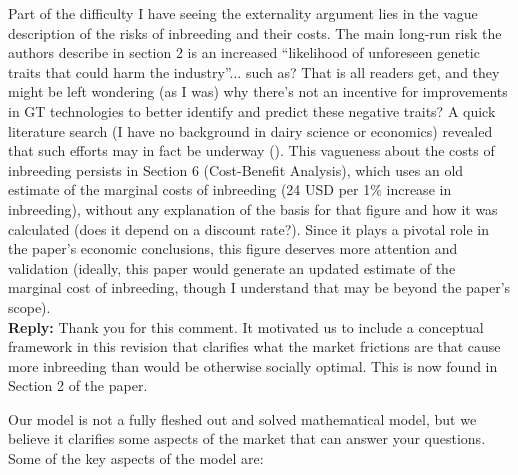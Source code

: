\documentclass[12pt,letterpaper]{article}
\begin{document}
{Part of the difficulty I have seeing the externality argument lies in the vague
description of the risks of inbreeding and their costs. The main long-run risk the
authors describe in section 2 is an increased ``likelihood of unforeseen genetic traits that could harm the industry''... such as? That is all readers get, and they might be left wondering (as I was) why there’s not an incentive for improvements in GT technologies to better identify and predict these negative traits? A quick literature search (I have no background in dairy science or economics) revealed that such efforts may in fact be underway (\cite{Howard2017}). This vagueness about the costs of inbreeding persists in Section 6 (Cost-Benefit Analysis), which uses an old estimate of the marginal costs of inbreeding (24 USD per 1\% increase in inbreeding), without any explanation of the basis for that figure and how it was calculated (does it depend on a discount rate?). Since it plays a pivotal role in the paper’s economic conclusions, this figure deserves more attention and validation (ideally, this paper would generate an updated estimate of the marginal cost of inbreeding, though I understand that may be beyond the paper’s scope).} \\

\textbf{Reply:} Thank you for this comment. It motivated us to include a conceptual framework in this revision that clarifies what the market frictions are that cause more inbreeding than would be otherwise socially optimal. This is now found in Section 2 of the paper.

Our model is not a fully fleshed out and solved mathematical model, but we believe it clarifies some aspects of the market that can answer your questions. Some of the key aspects of the model are:
\end{document}
